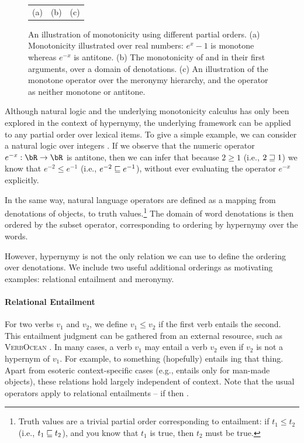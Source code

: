 \begin{figure}
\begin{center}
\begin{tabular}{ccc}
(a) & (b) & (c)
\end{tabular}
\end{center}
\caption{
An illustration of monotonicity using different partial orders.
(a) Monotonicity illustrated over real numbers: $e^x-1$ is monotone whereas
    $e^{-x}$ is antitone.
(b) The monotonicity of  and  in their first arguments, over
    a domain of denotations.
(c) An illustration of the  monotone operator over the meronymy hierarchy,
    and the operator  as neither monotone or antitone.
}
\end{figure}

Although natural logic and the underlying monotonicity calculus has 
  only been explored in the context of hypernymy, the underlying framework
  can be applied to any partial order over lexical items.
To give a simple example, 
  we can consider a natural logic over integers \cite{key:2014icard-natlog}.
If we observe that the numeric operator $e^{-x} : \bR \rightarrow \bR$ is
  antitone, then we can infer that because $2 \geq 1$ (i.e., $2 \sqsupseteq 1$)
  we know that $e^{-2} \leq e^{-1}$ (i.e., $e^{-2} \sqsubseteq e^{-1}$), without
  ever evaluating the operator $e^{-x}$ explicitly.

In the same way, natural language operators are defined as a mapping from
  denotations of objects, to truth values.\footnote{
  Truth values are a trivial partial order corresponding to entailment:
  if \hbox{$t_1 \leq t_2$} 
  (i.e., \hbox{$t_1 \sqsubseteq t_2$}),
  and you know that $t_1$ is true, then $t_2$ must be true.
}
The domain of word denotations is then ordered by the subset operator, corresponding
  to ordering by hypernymy over the words.

However, hypernymy is not the only relation we can use to define the ordering over
  denotations.
We include two useful additional orderings as motivating examples: relational
  entailment and meronymy.

\paragraph{Relational Entailment}
For two verbs $v_1$ and $v_2$, we define $v_1 \leq v_2$ if the first verb
  entails the second.
This entailment judgment can be gathered from an external resource, such as
  \textsc{VerbOcean} \cite{key:2004chklovski-verbocean}.
In many cases, a verb $v_1$ may entail a verb $v_2$ even if $v_2$ is not a hypernym of $v_1$.
For example, to  something (hopefully) entails ing that thing.
Apart from esoteric context-specific cases (e.g.,  entails  only
  for man-made objects), these relations hold largely independent of context.
Note that the usual operators apply to relational entailments -- if 
   then .

